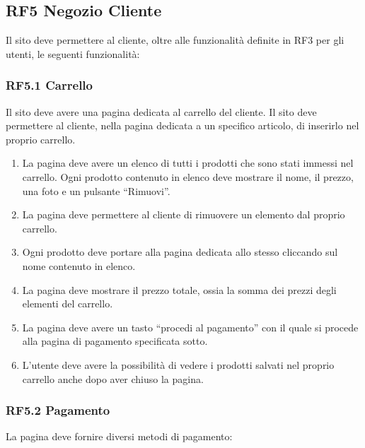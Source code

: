 \documentclass{report}
\begin{document}
\subsection*{RF5 Negozio Cliente}
Il sito deve permettere al cliente, oltre alle funzionalità definite in RF3 per gli utenti, le seguenti funzionalità:

\subsubsection{RF5.1 Carrello}
Il sito deve avere una pagina dedicata al carrello del cliente.
Il sito deve permettere al cliente, nella pagina dedicata a un specifico articolo, di inserirlo nel proprio carrello.

\begin{enumerate}
	\item La pagina deve avere un elenco di tutti i prodotti che sono stati immessi nel carrello. Ogni prodotto contenuto in elenco deve mostrare il nome, il prezzo, una foto e un pulsante “Rimuovi”.
	
	\item La pagina deve permettere al cliente di rimuovere un elemento dal proprio carrello. %

	\item Ogni prodotto deve portare alla pagina dedicata allo stesso cliccando sul nome contenuto in elenco.
	
	\item La pagina deve mostrare il prezzo totale, ossia la somma dei prezzi degli elementi del carrello.

	\item La pagina deve avere un tasto “procedi al pagamento” con il quale si procede alla pagina di pagamento specificata sotto.
	
	\item L'utente deve avere la possibilità di vedere i prodotti salvati nel proprio carrello anche dopo aver chiuso la pagina.

\end{enumerate}

\subsubsection*{RF5.2 Pagamento}
La pagina deve fornire diversi metodi di pagamento:
\end{document}
